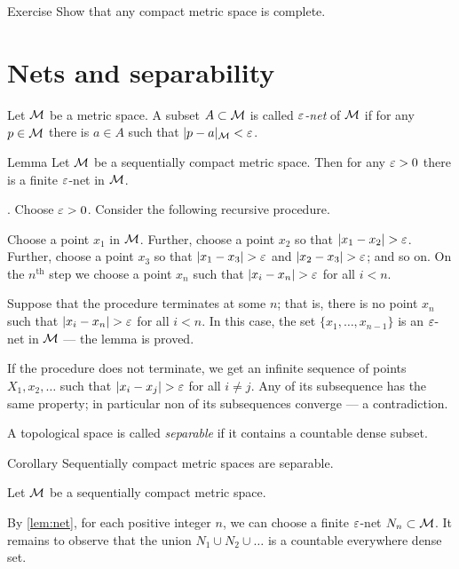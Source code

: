 \begin{thm}{Exercise}\label{ex:compact-complete}
Show that any compact metric space is complete. 
\end{thm}


\section{Nets and separability}

Let $\mathcal{M}$ be a metric space.
A subset $A\subset\mathcal{M}$ is called \emph{$\varepsilon$-net} of $\mathcal{M}$ if for any $p\in \mathcal{M}$  there is $a\in A$ such that $|p-a|_{\mathcal{M}}<\varepsilon$.

\begin{thm}{Lemma}\label{lem:net}
Let $\mathcal{M}$ be a sequentially compact metric space.
Then for any $\varepsilon>0$ there is a finite $\varepsilon$-net in $\mathcal{M}$.
\end{thm}

.
Choose $\varepsilon>0$.
Consider the following recursive procedure. 

Choose a point $x_1$ in $\mathcal{M}$.
Further, choose a point $x_2$ so that $|x_1\z-x_2|>\eps$.
Further, choose a point $x_3$ so that $|x_1\z-x_3|>\eps$ and $|x_2\z-x_3|>\eps$; and so on.
On the $n^{\text{th}}$ step we choose a point $x_n$ such that $|x_i\z-x_n|>\eps$ for all $i<n$.

Suppose that the procedure terminates at some $n$;
that is, there is no point $x_n$ such that $|x_i\z-x_n|>\eps$ for all $i<n$.
In this case, the set $\{x_1,\dots,x_{n-1}\}$ is an $\varepsilon$-net in $\mathcal{M}$ --- the lemma is proved.

If the procedure does not terminate, we get an infinite sequence of points $X_1,x_2,\dots$ such that $|x_i-x_j|>\eps$ for all $i\ne j$.
Any of its subsequence has the same property; in particular non of its subsequences converge --- a contradiction.
\qeds

A topological space is called \emph{separable} if it contains a countable dense subset.

\begin{thm}{Corollary}\label{cor:comp>separable}
Sequentially compact metric spaces are separable.
\end{thm}

Let $\mathcal{M}$ be a sequentially compact metric space.

By \ref{lem:net}, for each positive integer $n$,
we can choose a finite $\varepsilon$-net $N_n\subset\mathcal{M}$.
It remains to observe that the union $N_1\cup N_2\cup \dots$ is a countable everywhere dense set.
\qeds

